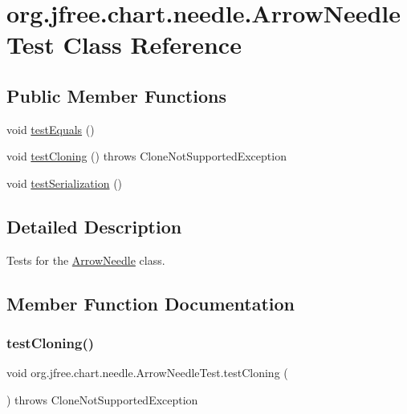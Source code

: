 \hypertarget{classorg_1_1jfree_1_1chart_1_1needle_1_1_arrow_needle_test}{}\section{org.\+jfree.\+chart.\+needle.\+Arrow\+Needle\+Test Class Reference}
\label{classorg_1_1jfree_1_1chart_1_1needle_1_1_arrow_needle_test}
\subsection*{Public Member Functions}
\begin{DoxyCompactItemize}
\item 
void \mbox{\hyperlink{classorg_1_1jfree_1_1chart_1_1needle_1_1_arrow_needle_test_a2803a1e38f7018db15b1d7dcf6a72639}{test\+Equals}} ()
\item 
void \mbox{\hyperlink{classorg_1_1jfree_1_1chart_1_1needle_1_1_arrow_needle_test_acb1cb12996446eb34bf86858a96ddca7}{test\+Cloning}} ()  throws Clone\+Not\+Supported\+Exception 
\item 
void \mbox{\hyperlink{classorg_1_1jfree_1_1chart_1_1needle_1_1_arrow_needle_test_a2aa4c62a9086156d774f0234f3f991ae}{test\+Serialization}} ()
\end{DoxyCompactItemize}


\subsection{Detailed Description}
Tests for the \mbox{\hyperlink{classorg_1_1jfree_1_1chart_1_1needle_1_1_arrow_needle}{Arrow\+Needle}} class. 

\subsection{Member Function Documentation}
\mbox{\label{classorg_1_1jfree_1_1chart_1_1needle_1_1_arrow_needle_test_acb1cb12996446eb34bf86858a96ddca7}} 
\subsubsection{\texorpdfstring{test\+Cloning()}{testCloning()}}
{\footnotesize\ttfamily void org.\+jfree.\+chart.\+needle.\+Arrow\+Needle\+Test.\+test\+Cloning (\begin{DoxyParamCaption}{ }\end{DoxyParamCaption}) throws Clone\+Not\+Supported\+Exception}

